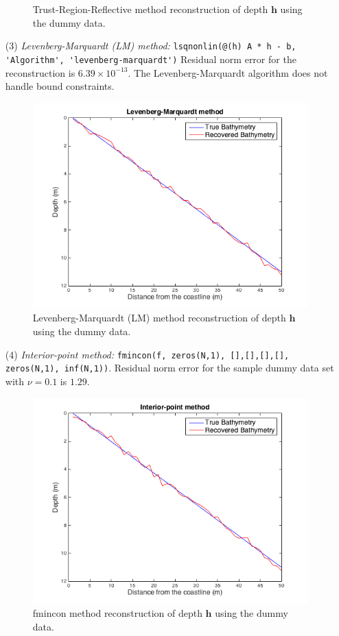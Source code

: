 \begin{itemize}
\begin{figure}[H]
\caption{Trust-Region-Reflective method reconstruction of depth $\mathbf{h}$ using the dummy data.}
\label{trust_region_fig}
\end{figure}
\item[(3)]  \textit{Levenberg-Marquardt (LM) method:}  
\verb|lsqnonlin(@(h) A * h - b, 'Algorithm', 'levenberg-marquardt')|
Residual norm error for the reconstruction is $6.39 \times 10^{-13}$. The Levenberg-Marquardt algorithm does not handle bound constraints. 
\begin{figure}[H]
\center
\includegraphics[scale=0.6]{img/LM_linear.png} 
\caption{Levenberg-Marquardt (LM) method reconstruction of depth $\mathbf{h}$ using the dummy data.}
\label{LM_fig}
\end{figure}
\item[(4)]  \textit{Interior-point method:} \verb|fmincon(f, zeros(N,1), [],[],[],[], zeros(N,1), inf(N,1))|. Residual norm error for the sample dummy data set  with $\nu = 0.1$ is $1.29$. 
\begin{figure}[H]
\center
\includegraphics[scale=0.6]{img/fmincon_linear.png} 
\caption{fmincon method reconstruction of depth $\mathbf{h}$ using the dummy data.}
\label{LM_fig}
\end{figure}
\end{itemize}



